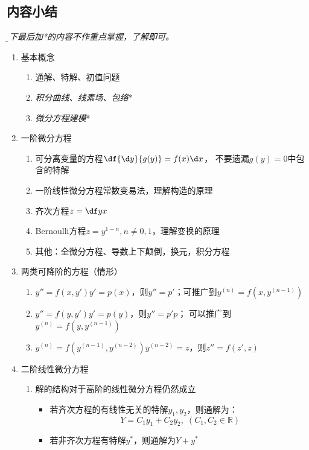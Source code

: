 \subsection{内容小结}

{\it\b 以下最后加*的内容不作重点掌握，了解即可。}

\begin{enumerate}[1.]
  \item 基本概念
  \begin{enumerate}[(1)]
    \item 通解、特解、初值问题
    \item {\it 积分曲线、线素场、包络}*
    \item {\it 微分方程建模}*
  \end{enumerate}
  \item 一阶微分方程
  \begin{enumerate}[(1)]
    \item 可分离变量的方程\dotfill$\df{\d y}{g(y)}=f(x)\d x$，
    不要遗漏$g(y)=0$中包含的特解
    \item 一阶线性微分方程\dotfill 常数变易法，理解构造的原理
    \item 齐次方程\dotfill$z=\df yx$
    \item Bernoulli方程\dotfill$z=y^{1-n},n\ne0,1$，理解变换的原理
    \item 其他：全微分方程、导数上下颠倒，换元，积分方程
  \end{enumerate}
  \item 两类可降阶的方程（情形）
  \begin{enumerate}[(1)]
    \item $y''=f(x,y')$$y'=p(x)$，则$y''=p'$；可推广到$y^{(n)}=f(x,y^{(n-1)})$
    \item $y''=f(y,y')$\dotfill$y'=p(y)$，则$y''=p'p$；
    可以推广到$y^{(n)}=f(y,y^{(n-1)})$
    \item $y^{(n)}=f(y^{(n-1)},y^{(n-2)})$\dotfill$y^{(n-2)}=z$，则$z''=f(z',z)$
  \end{enumerate}
  \item 二阶线性微分方程
  \begin{enumerate}[(1)]
    \item 解的结构\dotfill 对于高阶的线性微分方程仍然成立
    \begin{itemize}
      \item 若齐次方程的有线性无关的特解$y_1,y_2$，则通解为：
      $$Y=C_1y_1+C_2y_2,\;(C_1,C_2\in\mathbb{R})$$
      \item 若非齐次方程有特解$y^*$，则通解为$Y+y^*$

\end{itemize}
\end{enumerate}
\end{enumerate}
